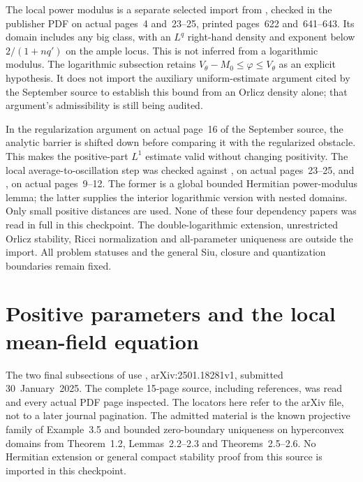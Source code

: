 The local power modulus is a separate selected import from
\cite[Theorem~D]{DDGHKZ14HolderPublished}, checked in the
publisher PDF on actual pages~4 and~23--25, printed pages~622
and~641--643. Its domain includes any big class, with an $L^q$
right-hand density and exponent below $2/(1+nq')$ on the
ample locus. This is not inferred from a logarithmic modulus.
The logarithmic subsection retains
$V_\theta-M_0\leq\varphi\leq V_\theta$ as an explicit
hypothesis. It does not import the auxiliary uniform-estimate
argument cited by the September source to establish this bound
from an Orlicz density alone; that argument's admissibility is
still being audited.

In the regularization argument on actual page~16 of the
September source, the analytic barrier is shifted down before
comparing it with the regularized obstacle. This makes the
positive-part $L^1$ estimate valid without changing positivity.
The local average-to-oscillation step was checked against
\cite[Lemma~4.4]{LPT21StabilityPublished}, on actual pages~23--25,
and \cite[Lemma~3.3 and condition~(3.1)]{Zeriahi20ModulusV1},
on actual pages~9--12. The former is a global bounded Hermitian
power-modulus lemma; the latter supplies the interior logarithmic
version with nested domains. Only small positive distances are
used. None of these four dependency papers was read in full
in this checkpoint. The double-logarithmic extension, unrestricted
Orlicz stability, Ricci normalization and all-parameter uniqueness
are outside the import. All problem statuses and the general
Siu, closure and quantization boundaries remain fixed.

\section{Positive parameters and the local mean-field equation}
\label{sec:provenance-meanfield-local-projective}

The two final subsections of
 use
\cite{LuPhung25MeanFieldV1}, arXiv:2501.18281v1, submitted
30~January~2025. The complete 15-page source, including references,
was read and every actual PDF page inspected. The locators here
refer to the arXiv file, not to a later journal pagination.
The admitted material is the known projective family of
Example~3.5 and bounded zero-boundary uniqueness on hyperconvex
domains from Theorem~1.2, Lemmas~2.2--2.3 and Theorems~2.5--2.6.
No Hermitian extension or general compact stability proof from
this source is imported in this checkpoint.

